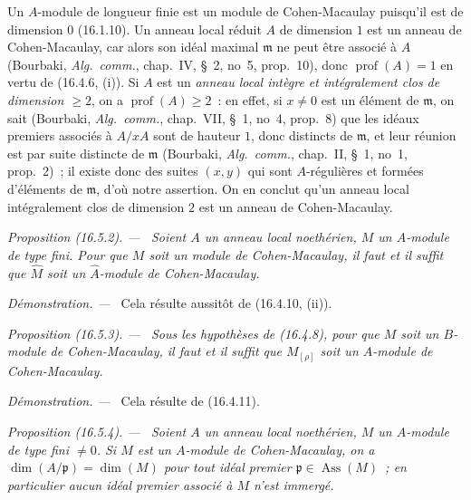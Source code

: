\documentclass[10pt,oneside]{book}
\makeatletter
\newcommand{\setmanualcurrentlabel}[1]{\def\@currentlabel{#1}}
\newenvironment{proposition}[1][]{%
  \setmanualcurrentlabel{#1}\par\medskip\noindent\itshape Proposition (#1). ---\ }{\par}
\newenvironment{proof}{%
  \par\medskip\noindent\textit{Démonstration. ---\ }}{\par}
\makeatother
\begin{document}
Un $A$-module de longueur finie est un module de Cohen-Macaulay puisqu'il est
de dimension $0$ (16.1.10). Un anneau local réduit $A$ de dimension $1$ est un
anneau de Cohen-Macaulay, car alors son idéal maximal $\mathfrak{m}$ ne peut
être associé à $A$ (Bourbaki, \emph{Alg.~comm.}, chap.~IV, \S~2, no~5,
prop.~10), donc $\operatorname{prof}(A)=1$ en vertu de (16.4.6, (i)). Si $A$
est un \emph{anneau local intègre et intégralement clos de dimension $\geq2$},
on a $\operatorname{prof}(A)\geq2$~: en effet, si $x\neq0$ est un élément de
$\mathfrak{m}$, on sait (Bourbaki, \emph{Alg.~comm.}, chap.~VII, \S~1, no~4,
prop.~8) que les idéaux premiers associés à $A/xA$ sont de hauteur $1$, donc
distincts de $\mathfrak{m}$, et leur réunion est par suite distincte de
$\mathfrak{m}$ (Bourbaki, \emph{Alg.~comm.}, chap.~II, \S~1, no~1, prop.~2)~;
il existe donc des suites $(x,y)$ qui sont $A$-régulières et formées
d'éléments de $\mathfrak{m}$, d'où notre assertion. On en conclut qu'un anneau
local intégralement clos de dimension $2$ est un anneau de Cohen-Macaulay.

\begin{proposition}[16.5.2]
\label{0.16.5.2-fr}
Soient $A$ un anneau local noethérien, $M$ un $A$-module de type fini. Pour que
$M$ soit un module de Cohen-Macaulay, il faut et il suffit que $\widehat M$
soit un $\widehat A$-module de Cohen-Macaulay.
\end{proposition}

\begin{proof}
Cela résulte aussitôt de (16.4.10, (ii)).
\end{proof}

\begin{proposition}[16.5.3]
\label{0.16.5.3-fr}
Sous les hypothèses de (16.4.8), pour que $M$ soit un $B$-module de
Cohen-Macaulay, il faut et il suffit que $M_{[\rho]}$ soit un $A$-module de
Cohen-Macaulay.
\end{proposition}

\begin{proof}
Cela résulte de (16.4.11).
\end{proof}

\begin{proposition}[16.5.4]
\label{0.16.5.4-fr}
Soient $A$ un anneau local noethérien, $M$ un $A$-module de type fini $\neq0$.
Si $M$ est un $A$-module de Cohen-Macaulay, on a
$\dim(A/\mathfrak{p})=\dim(M)$ pour tout idéal premier
$\mathfrak{p}\in\operatorname{Ass}(M)$~; en particulier aucun idéal premier
associé à $M$ n'est immergé.
\end{proposition}
\end{document}
